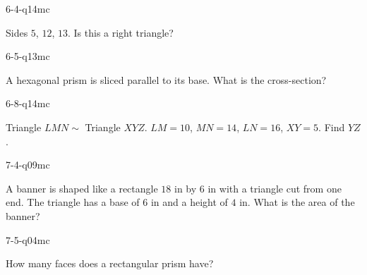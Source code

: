 \begin{practiceQuestion}{6-4-q14}{mc}
\begin{questionText}
Sides $5$, $12$, $13$. Is this a right triangle?
\end{questionText}
\end{practiceQuestion}

\begin{practiceQuestion}{6-5-q13}{mc}
\begin{questionText}
A hexagonal prism is sliced parallel to its base. What is the cross-section?
\end{questionText}
\end{practiceQuestion}

\begin{practiceQuestion}{6-8-q14}{mc}
\begin{questionText}
Triangle $LMN \sim$ Triangle $XYZ$. $LM = 10$, $MN = 14$, $LN = 16$, $XY = 5$. Find $YZ$.
\end{questionText}
\end{practiceQuestion}

\begin{practiceQuestion}{7-4-q09}{mc}
\begin{questionText}
A banner is shaped like a rectangle $18$ in by $6$ in with a triangle cut from one end. The triangle has a base of $6$ in and a height of $4$ in. What is the area of the banner?
\end{questionText}
\end{practiceQuestion}

\begin{practiceQuestion}{7-5-q04}{mc}
\begin{questionText}
How many faces does a rectangular prism have?
\end{questionText}
\end{practiceQuestion}

